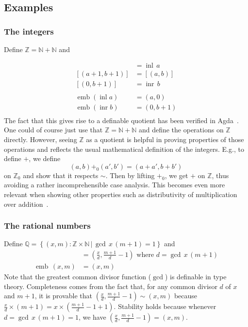 \documentclass[envcountsame]{llncs}
\newcommand{\N}{\mathbb{N}}
\newcommand{\Q}{\mathbb{Q}}
\newcommand{\Z}{\mathbb{Z}}
\providecommand{\class}[1]{[#1]}
\providecommand{\set}  [1]{\left\{#1\right\}}
\DeclareMathOperator{\emb}{emb}
\DeclareMathOperator{\inl}{inl}
\DeclareMathOperator{\inr}{inr}
\begin{document}
\subsection{Examples}\label{sec:dquotients:examples}

\subsubsection*{The integers}
Define $\Z =\N + \N $ and

\begin{align*}
\class{(a,0)} &= \inl\,a\\
\class{(a+1,b+1)} &= \class{(a,b)}\\
\class{(0,b+1)} &= \inr\,b\\\\
\emb (\inl a) &= (a,0)\\
\emb (\inr b) &= (0,b+1)\\
\end{align*}
The fact that this gives rise to a definable quotient has been verified in Agda~\cite{nuo2010report}.
 One could of course just use that $\Z=\N + \N$ and define the operations on $\Z$ directly. However, seeing  $\Z$ as a quotient is helpful in proving properties of those operations and reflects the usual mathematical definition of the integers. E.g., to define $+$, we define
\[(a,b){+_0}(a', b')= (a+a',b+b')\]
on $\Z_0$ and show that it respects $\sim$. Then by lifting $+_0$, we get $+$ on $\Z$, thus avoiding a rather incomprehensible case analysis. This becomes even more relevant when showing other properties such as distributivity of multiplication over addition~\cite{nuo2010report}.

\subsubsection*{The rational numbers}

Define $\Q = \set{(x,m):\Z\times\N \,|\, \gcd\, x\,  (m+1) = 1}$ and
\begin{align*}
\class{(x,m)}&=\left(\frac{x}{d},\frac{m+1}{d}-1\right) \text{ where } d = \gcd\,x \,(m+1)\\
\emb \,(x,m) &= (x,m)
\end{align*}
Note that the greatest common divisor function ($\gcd$) is definable in type theory. Completeness comes from the fact that, for any common divisor $d$ of $x$ and $m+1$, it is provable that $\left(\frac x d,\frac {m+1} d-1\right)\sim\left(x,m\right)$ because $\frac x d \times (m+1) = x\times(\frac {m+1} d - 1+1)$.  Stability holds because whenever $d=\gcd\, x\, (m+1) = 1$, we have $\left(\frac{x}{d},\frac{m+1}{d}-1\right)=(x,m)$.
\end{document}
